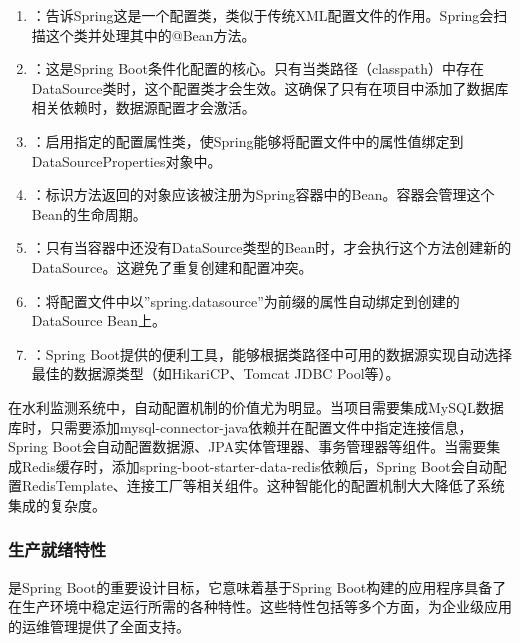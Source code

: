 
\begin{enumerate}
\def\labelenumi{\arabic{enumi}.}
\item
  ：告诉Spring这是一个配置类，类似于传统XML配置文件的作用。Spring会扫描这个类并处理其中的@Bean方法。
\item
  ：这是Spring Boot条件化配置的核心。只有当类路径（classpath）中存在DataSource类时，这个配置类才会生效。这确保了只有在项目中添加了数据库相关依赖时，数据源配置才会激活。
\item
  ：启用指定的配置属性类，使Spring能够将配置文件中的属性值绑定到DataSourceProperties对象中。
\item
  ：标识方法返回的对象应该被注册为Spring容器中的Bean。容器会管理这个Bean的生命周期。
\item
  ：只有当容器中还没有DataSource类型的Bean时，才会执行这个方法创建新的DataSource。这避免了重复创建和配置冲突。
\item
  ：将配置文件中以''spring.datasource''为前缀的属性自动绑定到创建的DataSource Bean上。
\item
  ：Spring Boot提供的便利工具，能够根据类路径中可用的数据源实现自动选择最佳的数据源类型（如HikariCP、Tomcat JDBC Pool等）。
\end{enumerate}

在水利监测系统中，自动配置机制的价值尤为明显。当项目需要集成MySQL数据库时，只需要添加mysql-connector-java依赖并在配置文件中指定连接信息，Spring Boot会自动配置数据源、JPA实体管理器、事务管理器等组件。当需要集成Redis缓存时，添加spring-boot-starter-data-redis依赖后，Spring Boot会自动配置RedisTemplate、连接工厂等相关组件。这种智能化的配置机制大大降低了系统集成的复杂度。

\hypertarget{ux751fux4ea7ux5c31ux7eeaux7279ux6027}{%
\subsubsection{生产就绪特性}\label{ux751fux4ea7ux5c31ux7eeaux7279ux6027}}

是Spring Boot的重要设计目标，它意味着基于Spring Boot构建的应用程序具备了在生产环境中稳定运行所需的各种特性。这些特性包括等多个方面，为企业级应用的运维管理提供了全面支持。

